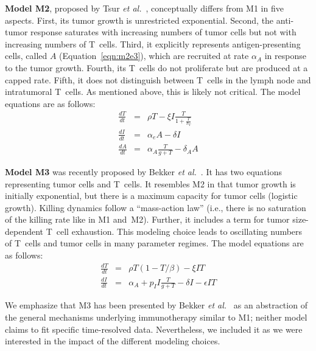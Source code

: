 \documentclass[a4paper,10pt]{article}
\begin{document}
 {\bfseries Model M2}, proposed by  Tsur \emph{et al.}~\cite{Tsur2020}, conceptually differs from M1 in five aspects.
First, its tumor growth is unrestricted exponential. Second, the anti-tumor response saturates with increasing numbers
of tumor cells but not with increasing numbers of T~cells. Third, it explicitly represents antigen-presenting cells,
called $A$ (Equation~\ref{eqn:m2e3}), which are recruited at rate $\alpha_A$ in response to the tumor growth. 
Fourth, its T~cells do not proliferate but are produced at a capped rate. 
Fifth, it does not distinguish between T~cells in the lymph node and intratumoral T~cells. As mentioned above, this is likely not critical.
The model equations are as follows:
\begin{eqnarray}
\frac{dT}{dt} & = & \rho T - \xi I \frac{ T }{1+\frac{T}{h_T}} \label{eqn:m2e1} \\
\frac{dI}{dt} & = & \alpha_e A - \delta I  \label{eqn:m2e2}  \\
\frac{dA}{dt} & = & \alpha_A \frac{T}{g+T} - \delta_A A \label{eqn:m2e3}
\end{eqnarray} 

 {\bfseries Model M3} was recently proposed by Bekker \emph{et al.}~\cite{Bekker2022}. It has two equations 
representing tumor cells and T~cells. It resembles M2 in that tumor growth is initially exponential, but there is a maximum capacity for tumor cells (logistic growth). Killing dynamics follow a ``mass-action law'' (i.e., there is no saturation of the killing rate like in M1 and~M2). Further, it includes a term for tumor size-dependent T~cell exhaustion. This modeling choice leads to oscillating numbers of T~cells and tumor cells in many parameter regimes. The model equations are as follows:
\begin{eqnarray}
\frac{dT}{dt} & = & \rho T (1 - T/\beta) - \xi I T  \label{eqn:m3e1}  \\
\frac{dI}{dt} & = & \alpha_A + p_I I \frac{T}{g+T} - \delta I - \epsilon IT  \label{eqn:m3e2} 
\end{eqnarray} 

We emphasize that M3 has been presented by Bekker \emph{et al.}~\cite{Bekker2022} as an abstraction of the general mechanisms underlying immunotherapy similar to M1; neither model claims to fit specific time-resolved data. Nevertheless, we included it as we were interested in the impact of the different modeling choices. 
\end{document}
